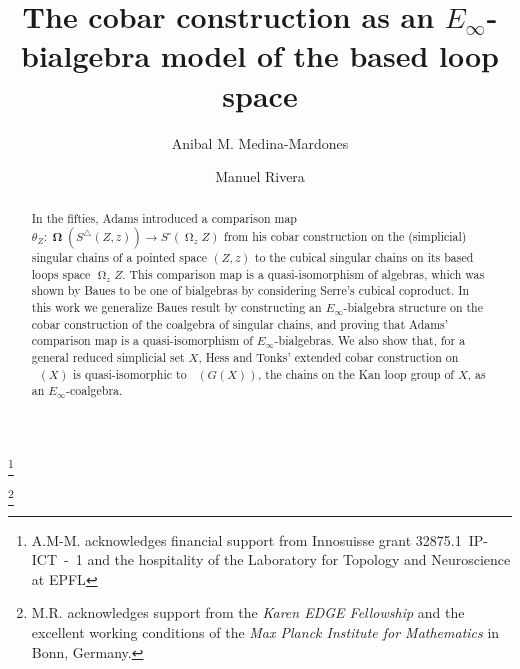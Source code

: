 \documentclass{amsart}
\newcommand{\simplex}{\triangle}
\newcommand{\cube}{\square}
\DeclareMathOperator{\schains}{N^{\simplex}}
\DeclareMathOperator{\loops}{\Omega}
\DeclareMathOperator{\cobar}{\mathbf{\Omega}}
\theoremstyle{definition}
\begin{document}
\title{The cobar construction as an $E_{\infty}$-bialgebra model of the based loop space}
\author{Anibal M. Medina-Mardones}
\address{Max Plank Institute for Mathematics, Bonn, Germany}
\address{Department of Mathematics, University of Notre Dame, Notre Dame, IN, USA}
\thanks{A.M-M. acknowledges financial support from Innosuisse grant \mbox{32875.1 IP-ICT - 1} and the hospitality of the Laboratory for Topology and Neuroscience at EPFL}

\author{Manuel Rivera}
\address{Department of Mathematics, Purdue University, West Lafayette, IN, USA}
\thanks{M.R. acknowledges support from the \textit{Karen EDGE Fellowship} and the excellent working conditions of the \textit{Max Planck Institute for Mathematics} in Bonn, Germany.}


\begin{abstract}
    In the fifties, Adams introduced a comparison map $\theta_Z \colon \cobar(S^\simplex(Z,z)) \to S^\cube(\loops_z Z)$ from his cobar construction on the (simplicial) singular chains of a pointed space $(Z, z)$ to the cubical singular chains on its based loops space $\loops_z Z$.
	This comparison map is a quasi-isomorphism of algebras, which was shown by Baues to be one of bialgebras by considering Serre's cubical coproduct.
	In this work we generalize Baues result by constructing an $E_{\infty}$-bialgebra structure on the cobar construction of the coalgebra of singular chains, and proving that Adams' comparison map is a quasi-isomorphism of $E_{\infty}$-bialgebras.
	We also show that, for a general reduced simplicial set $X$, Hess and Tonks' extended cobar construction on $\schains(X)$ is quasi-isomorphic to $\schains(G(X))$, the chains on the Kan loop group of $X$, as an $E_{\infty}$-coalgebra. 
\end{abstract}

\vspace*{-1cm}

\maketitle
\setcounter{tocdepth}{1}
\tableofcontents








\end{document}
